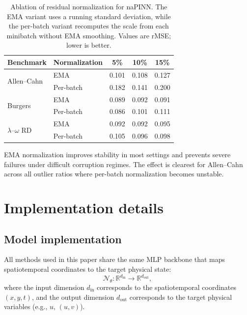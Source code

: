 \documentclass{article}
\theoremstyle{plain}
\theoremstyle{definition}
\theoremstyle{remark}
\begin{document}
\begin{sc}
\begin{table}[t]
\centering
\small
\caption{Ablation of residual normalization for naPINN. The EMA variant uses a running standard deviation, while the per-batch variant recomputes the scale from each minibatch without EMA smoothing. Values are rMSE; lower is better.}
\label{tab:running_std_ablation}
\setlength{\tabcolsep}{5pt}
\begin{tabular}{llccc}
\toprule
Benchmark & Normalization & 5\% & 10\% & 15\% \\
\midrule
\multirow{2}{*}{Allen--Cahn}
 & EMA & 0.101 & 0.108 & 0.127 \\
 & Per-batch & 0.182 & 0.141 & 0.200 \\
\midrule
\multirow{2}{*}{Burgers}
 & EMA & 0.089 & 0.092 & 0.091 \\
 & Per-batch & 0.086 & 0.101 & 0.111 \\
\midrule
\multirow{2}{*}{$\lambda$--$\omega$ RD}
 & EMA & 0.092 & 0.092 & 0.095 \\
 & Per-batch & 0.105 & 0.096 & 0.098 \\
\bottomrule
\end{tabular}%

\end{table}
\end{sc}

EMA normalization improves stability in most settings and prevents severe failures under difficult corruption regimes.
The effect is clearest for Allen--Cahn across all outlier ratios where per-batch normalization becomes unstable.

\section{Implementation details}
\label{appendix:ImplementationDetails}

\subsection{Model implementation}
All methods used in this paper share the same MLP backbone that maps spatiotemporal coordinates to the target physical state:
\begin{equation}
    \mathcal{N}_\theta: \mathbb{R}^{d_\mathrm{in}} \rightarrow \mathbb{R}^{d_\mathrm{out}},
\end{equation}
where the input dimension $d_\mathrm{in}$ corresponds to the spatiotemporal coordinates $(x,y,t)$, and the output dimension $d_\mathrm{out}$ corresponds to the target physical variables (e.g., $u$, $(u, v)$).
\end{document}
